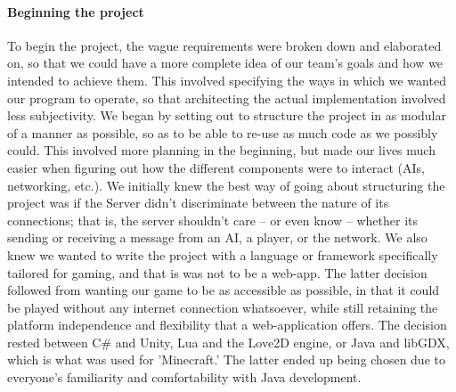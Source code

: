 \documentclass[a4paper,doc,draftfirst]{apa6}
\begin{document}
\paragraph{Beginning the project}
To begin the project, the vague requirements were broken down and elaborated on, so that we could have a more complete idea of our team's goals and how we intended to achieve them. This involved specifying the ways in which we wanted our program to operate, so that architecting the actual implementation involved less subjectivity. We began by setting out to structure the project in as modular of a manner as possible, so as to be able to re-use as much code as we possibly could. This involved more planning in the beginning, but made our lives much easier when figuring out how the different components were to interact (AIs, networking, etc.). We initially knew the best way of going about structuring the project was if the Server didn't discriminate between the nature of its connections; that is, the server shouldn't care -- or even know -- whether its sending or receiving a message from an AI, a player, or the network. We also knew we wanted to write the project with a language or framework specifically tailored for gaming, and that is was not to be a web-app. The latter decision followed from wanting our game to be as accessible as possible, in that it could be played without any internet connection whatsoever, while still retaining the platform independence and flexibility that a web-application offers. The decision rested between C# and Unity, Lua and the Love2D engine, or Java and libGDX, which is what was used for 'Minecraft.' The latter ended up being chosen due to everyone's familiarity and comfortability with Java development.   
\end{document}
